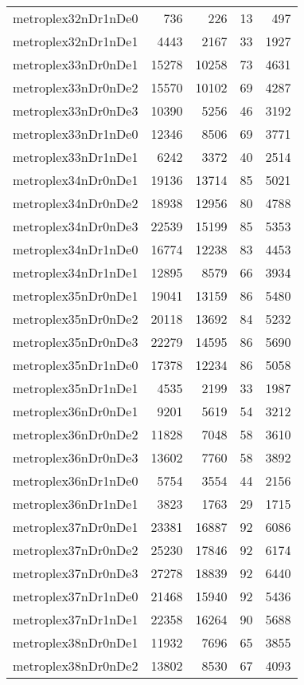 \begin{tabular}{lrrrr}
metroplex32nDr1nDe0 & 736 & 226 & 13 & 497 \\
metroplex32nDr1nDe1 & 4443 & 2167 & 33 & 1927 \\
metroplex33nDr0nDe1 & 15278 & 10258 & 73 & 4631 \\
metroplex33nDr0nDe2 & 15570 & 10102 & 69 & 4287 \\
metroplex33nDr0nDe3 & 10390 & 5256 & 46 & 3192 \\
metroplex33nDr1nDe0 & 12346 & 8506 & 69 & 3771 \\
metroplex33nDr1nDe1 & 6242 & 3372 & 40 & 2514 \\
metroplex34nDr0nDe1 & 19136 & 13714 & 85 & 5021 \\
metroplex34nDr0nDe2 & 18938 & 12956 & 80 & 4788 \\
metroplex34nDr0nDe3 & 22539 & 15199 & 85 & 5353 \\
metroplex34nDr1nDe0 & 16774 & 12238 & 83 & 4453 \\
metroplex34nDr1nDe1 & 12895 & 8579 & 66 & 3934 \\
metroplex35nDr0nDe1 & 19041 & 13159 & 86 & 5480 \\
metroplex35nDr0nDe2 & 20118 & 13692 & 84 & 5232 \\
metroplex35nDr0nDe3 & 22279 & 14595 & 86 & 5690 \\
metroplex35nDr1nDe0 & 17378 & 12234 & 86 & 5058 \\
metroplex35nDr1nDe1 & 4535 & 2199 & 33 & 1987 \\
metroplex36nDr0nDe1 & 9201 & 5619 & 54 & 3212 \\
metroplex36nDr0nDe2 & 11828 & 7048 & 58 & 3610 \\
metroplex36nDr0nDe3 & 13602 & 7760 & 58 & 3892 \\
metroplex36nDr1nDe0 & 5754 & 3554 & 44 & 2156 \\
metroplex36nDr1nDe1 & 3823 & 1763 & 29 & 1715 \\
metroplex37nDr0nDe1 & 23381 & 16887 & 92 & 6086 \\
metroplex37nDr0nDe2 & 25230 & 17846 & 92 & 6174 \\
metroplex37nDr0nDe3 & 27278 & 18839 & 92 & 6440 \\
metroplex37nDr1nDe0 & 21468 & 15940 & 92 & 5436 \\
metroplex37nDr1nDe1 & 22358 & 16264 & 90 & 5688 \\
metroplex38nDr0nDe1 & 11932 & 7696 & 65 & 3855 \\
metroplex38nDr0nDe2 & 13802 & 8530 & 67 & 4093 \\

\end{tabular}
